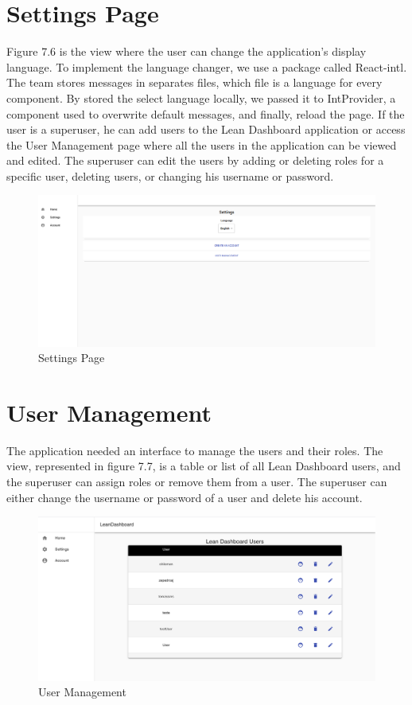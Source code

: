 \documentclass[a4paper,twoside,10pt]{report}
\begin{document}
\section{Settings Page}
 Figure 7.6 is the view where the user can change the application's display language. To implement the language changer, we use a package called React-intl. The team stores messages in separates files, which file is a language for every component. 
By stored the select language locally, we passed it to IntProvider, a component used to overwrite default messages, and finally, reload the page. 
If the user is a superuser, he can add users to the Lean Dashboard application or access the User Management page where all the users in the application can be viewed and edited. The superuser can edit the users by adding or deleting roles for a specific user, deleting users, or changing his username or password. 

\begin{figure}[h!]
\center
  \includegraphics[width=\textwidth]{settingsPage.png}
\caption{Settings Page}
\end{figure}
\section{User Management}
The application needed an interface to manage the users and their roles. The view, represented in figure 7.7, is a table or list of all Lean Dashboard users, and the superuser can assign roles or remove them from a user. The superuser can either change the username or password of a user and delete his account.
\begin{figure}[h!]
\center
  \includegraphics[width=\textwidth]{UserManagement.png}
\caption{User Management}
\end{figure}
\end{document}
